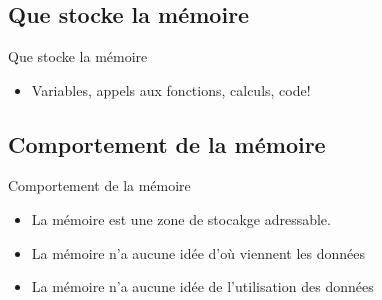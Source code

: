 \section{\sectitle}
\begin{frame}{\sectitle}
\def\subsectitle{Que stocke la mémoire}
\subsection{\subsectitle}
\begin{block}{\subsectitle}
\begin{itemize}
    \item Variables, 
    appels aux fonctions,
    calculs,
    code!
\end{itemize}
\end{block}

\def\subsectitle{Comportement de la mémoire}
\subsection{\subsectitle}
\begin{alertblock}{\subsectitle}
\begin{itemize}
    \item La mémoire est une zone de stocakge adressable.
    \item La mémoire n'a aucune idée d'où viennent les données
    \item La mémoire n'a aucune idée de l'utilisation des données
\end{itemize}
\end{alertblock}


\end{frame}

\def\sectitle{Problèmes}

